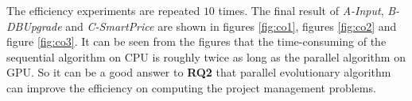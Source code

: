 The efficiency experiments are repeated $10$ times.  The final result of
\emph{A-Input}, \emph{B-DBUpgrade} and \emph{C-SmartPrice} are shown in figures
\ref{fig:co1}, figures \ref{fig:co2} and figure \ref{fig:co3}. It can be seen
from the figures that the time-consuming of the sequential algorithm on CPU is
roughly twice as long as the parallel algorithm on GPU. So it can be a good
answer to \textbf{RQ2} that parallel evolutionary algorithm can improve the
efficiency on computing the project management problems.

